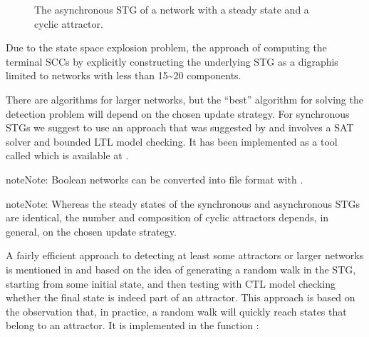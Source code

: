\documentclass[letterpaper,10pt,english]{sphinxmanual}
\begin{document}
\begin{figure}[htbp]
\centering
\capstart

\noindent{}
\caption{The asynchronous STG  of a network with a steady state and a cyclic attractor.}\label{\detokenize{Manual:figure25}}\label{\detokenize{Manual:id29}}\end{figure}

Due to the state space explosion problem, the approach of computing the terminal SCCs by explicitly
constructing the underlying STG as a digraphis limited to networks with less than 15\textasciitilde{}20 components.

There are algorithms for larger networks, but the “best” algorithm for solving the detection problem will depend on the chosen update strategy.
For synchronous STGs we suggest to use an approach that was suggested
by {\hyperref[\detokenize{Bibliography:dubrova2011}]{}} and involves a SAT solver and bounded LTL model checking.
It has been implemented as a tool called  which is available at .

\begin{sphinxadmonition}{note}{Note:}
Boolean networks can be converted into  file format with {\hyperref[\detokenize{FileExchange:primes2bns}]{}}.
\end{sphinxadmonition}

\begin{sphinxadmonition}{note}{Note:}
Whereas the steady states of the synchronous and asynchronous STGs are identical,
the number and composition of cyclic attractors depends, in general, on the chosen update strategy.
\end{sphinxadmonition}

A fairly efficient approach to detecting at least some attractors or larger networks is mentioned in {\hyperref[\detokenize{Bibliography:klarner2015trap}]{}}
and based on the idea of generating a random walk in the STG, starting from some initial state,
and then testing with CTL model checking whether the final state is indeed part of an attractor.
This approach is based on the observation that, in practice, a random walk will quickly reach states that belong to an attractor.
It is implemented in the function {\hyperref[\detokenize{AttractorDetection:find-attractor-state-by-randomwalk-and-ctl}]{}}:
\end{document}
